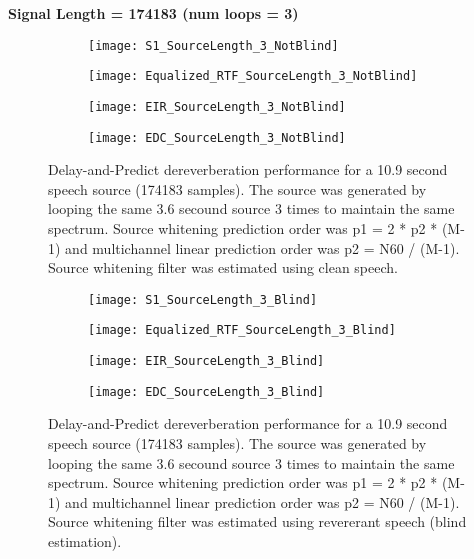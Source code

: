 \textbf{Signal Length = 174183 (num loops = 3)}

\begin{figure}[H]
	\centering
	\begin{subfigure}[b]{0.49\textwidth}
		\centering
		\texttt{[image: S1\_SourceLength\_3\_NotBlind]}
	\end{subfigure}
	\hfill
	\begin{subfigure}[b]{0.49\textwidth}
		\centering
		\texttt{[image: Equalized\_RTF\_SourceLength\_3\_NotBlind]}
	\end{subfigure}
	\hfill
	\begin{subfigure}[b]{0.49\textwidth}
		\centering
		\texttt{[image: EIR\_SourceLength\_3\_NotBlind]}
	\end{subfigure}
	\hfill
	\begin{subfigure}[b]{0.49\textwidth}
		\centering
		\texttt{[image: EDC\_SourceLength\_3\_NotBlind]}
	\end{subfigure}
	\hfill
	\caption{Delay-and-Predict dereverberation performance for a 10.9 second speech source (174183 samples). The source was generated by looping the same 3.6 secound source 3 times to maintain the same spectrum. Source whitening prediction order was p1 = 2 * p2 * (M-1) and multichannel linear prediction order was p2 = N60 / (M-1). Source whitening filter was estimated using clean speech.}
	\label{fig:params_source_length_3_not_blind}
\end{figure}

\begin{figure}[H]
	\centering
	\begin{subfigure}[b]{0.49\textwidth}
		\centering
		\texttt{[image: S1\_SourceLength\_3\_Blind]}
	\end{subfigure}
	\hfill
	\begin{subfigure}[b]{0.49\textwidth}
		\centering
		\texttt{[image: Equalized\_RTF\_SourceLength\_3\_Blind]}
	\end{subfigure}
	\hfill
	\begin{subfigure}[b]{0.49\textwidth}
		\centering
		\texttt{[image: EIR\_SourceLength\_3\_Blind]}
	\end{subfigure}
	\hfill
	\begin{subfigure}[b]{0.49\textwidth}
		\centering
		\texttt{[image: EDC\_SourceLength\_3\_Blind]}
	\end{subfigure}
	\hfill
	\caption{Delay-and-Predict dereverberation performance for a 10.9 second speech source (174183 samples). The source was generated by looping the same 3.6 secound source 3 times to maintain the same spectrum. Source whitening prediction order was p1 = 2 * p2 * (M-1) and multichannel linear prediction order was p2 = N60 / (M-1). Source whitening filter was estimated using revererant speech (blind estimation).}
	\label{fig:params_source_length_3_blind}
\end{figure}

